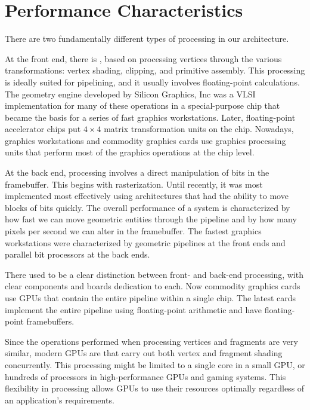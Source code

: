 \documentclass[\main/notes.tex]{subfiles}
\begin{document}
		\section{Performance Characteristics}
			There are two fundamentally different types of processing in our architecture.

			At the front end,
			there is ,
			based on processing vertices through the various transformations:
			vertex shading, clipping, and primitive assembly.
			This processing is ideally suited for pipelining,
			and it usually involves floating-point calculations.
			The geometry engine developed by Silicon Graphics, Inc
			was a VLSI implementation for many of these operations
			in a special-purpose chip that became
			the basis for a series of fast graphics workstations.
			Later, floating-point accelerator chips put
			$4 \times 4$ matrix transformation units on the chip.
			Nowadays, graphics workstations and commodity graphics cards use
			graphics processing units that perform most of the graphics operations
			at the chip level.

			At the back end,
			processing involves a direct manipulation of bits in the framebuffer.
			This begins with rasterization.
			Until recently, it was most implemented most effectively using architectures
			that had the ability to move blocks of bits quickly.
			The overall performance of a system is characterized by
			how fast we can move geometric entities through the pipeline
			and by how many pixels per second we can alter in the framebuffer.
			The fastest graphics workstations were characterized by
			geometric pipelines at the front ends
			and parallel bit processors at the back ends.

			There used to be a clear distinction between
			front- and back-end processing,
			with clear components and boards dedication to each.
			Now commodity graphics cards use GPUs that contain the entire pipeline
			within a single chip.
			The latest cards implement the entire pipeline using floating-point arithmetic
			and have floating-point framebuffers.

			Since the operations performed when processing vertices and fragments are very similar,
			modern GPUs are 
			that carry out both vertex and fragment shading concurrently.
			This processing might be limited to a single core in a small GPU,
			or hundreds of processors in high-performance GPUs and gaming systems.
			This flexibility in processing allows GPUs to use their resources optimally
			regardless of an application's requirements.
\end{document}
